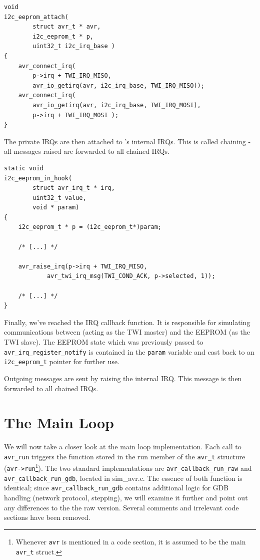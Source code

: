 \begin{lstlisting}
void
i2c_eeprom_attach(
		struct avr_t * avr,
		i2c_eeprom_t * p,
		uint32_t i2c_irq_base )
{
	avr_connect_irq(
		p->irq + TWI_IRQ_MISO,
		avr_io_getirq(avr, i2c_irq_base, TWI_IRQ_MISO));
	avr_connect_irq(
		avr_io_getirq(avr, i2c_irq_base, TWI_IRQ_MOSI),
		p->irq + TWI_IRQ_MOSI );
}
\end{lstlisting}

The private \acp{IRQ} are then attached to \simavr's internal \acp{IRQ}. This is called
chaining - all messages raised are forwarded to all chained \acp{IRQ}.

\begin{lstlisting}
static void
i2c_eeprom_in_hook(
		struct avr_irq_t * irq,
		uint32_t value,
		void * param)
{
	i2c_eeprom_t * p = (i2c_eeprom_t*)param;

    /* [...] */

    avr_raise_irq(p->irq + TWI_IRQ_MISO,
            avr_twi_irq_msg(TWI_COND_ACK, p->selected, 1));

    /* [...] */
}
\end{lstlisting}

Finally, we've reached the \ac{IRQ} callback function. It is responsible for
simulating communications between \simavr (acting as the \ac{TWI} master) and the
\ac{EEPROM} (as the \ac{TWI} slave). The \ac{EEPROM} state which was previously passed to
\lstinline|avr_irq_register_notify| is contained in the \lstinline|param| variable and cast back to
an \lstinline|i2c_eeprom_t| pointer for further use.

Outgoing messages are sent by raising the internal \ac{IRQ}. This message is then
forwarded to all chained \acp{IRQ}.


\section{The Main Loop} \label{section:mainloop}

We will now take a closer look at the main loop implementation. Each call to
\lstinline|avr_run| triggers the function stored in the run member of the \lstinline|avr_t| structure
(\lstinline|avr->run|\footnote{Whenever \lstinline|avr| is mentioned in a code
section, it is assumed to be the main \lstinline|avr_t| struct.}).
The two standard implementations are \lstinline|avr_callback_run_raw| and
\lstinline|avr_callback_run_gdb|, located in sim\_avr.c. The essence of both function is
identical; since \lstinline|avr_callback_run_gdb| contains additional logic for \ac{GDB}
handling (network protocol, stepping), we will examine it further and point out
any differences to the the raw version. Several comments and irrelevant code
sections have been removed.

